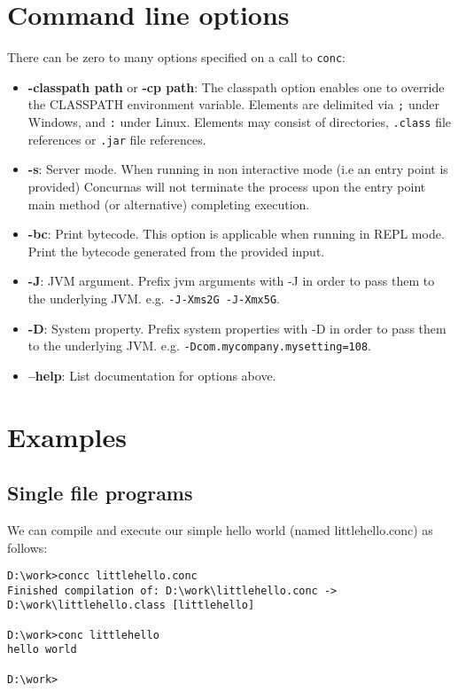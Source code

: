 \documentclass[conc-doc]{subfiles}
\begin{document}
\section{Command line options}
\label{sec:cmdlineparams}
There can be zero to many options specified on a call to \lstinline[language=None]{conc}:
\begin{itemize}
	\item \textbf{-classpath path} or \textbf{-cp path}: The classpath option enables one to override the CLASSPATH environment variable. Elements are delimited via \lstinline{;} under Windows, and \lstinline{:} under Linux. Elements may consist of directories, \lstinline{.class} file references or \lstinline{.jar} file references.
	\item \textbf{-s}: Server mode. When running in non interactive mode (i.e an entry point is provided) Concurnas will not terminate the process upon the entry point main method (or alternative) completing execution.
	\item \textbf{-bc}: Print bytecode. This option is applicable when running in REPL mode. Print the bytecode generated from the provided input.
	\item \textbf{-J}: JVM argument. Prefix jvm arguments with -J in order to pass them to the underlying JVM. e.g. \lstinline{-J-Xms2G -J-Xmx5G}.
	\item \textbf{-D}: System property. Prefix system properties with -D in order to pass them to the underlying JVM. e.g. \lstinline{-Dcom.mycompany.mysetting=108}.
	\item \textbf{--help}: List documentation for options above.
\end{itemize}



\section{Examples}
\subsection{Single file programs}
We can compile and execute our simple hello world (named littlehello.conc) as follows:

\begin{lstlisting}[language=None]
D:\work>concc littlehello.conc
Finished compilation of: D:\work\littlehello.conc -> D:\work\littlehello.class [littlehello]

D:\work>conc littlehello
hello world

D:\work>
\end{lstlisting}
\end{document}
